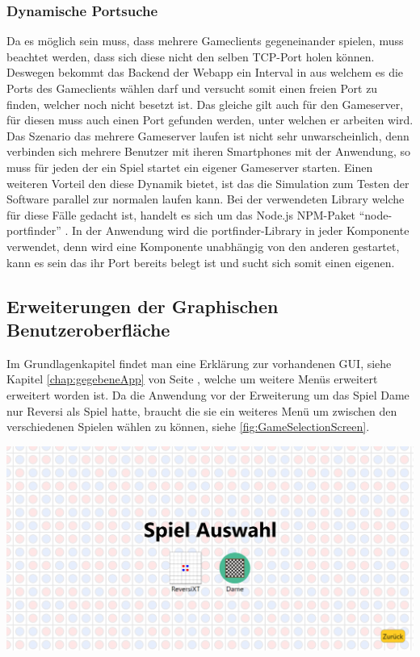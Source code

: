 \documentclass[12pt,a4paper,bibliography=totocnumbered,listof=totocnumbered]{article}
\begin{document}
\subsubsection{Dynamische Portsuche}
Da es möglich sein muss, dass mehrere Gameclients gegeneinander spielen, muss beachtet werden, dass sich diese nicht den selben TCP-Port holen können.
Deswegen bekommt das Backend der Webapp ein Interval in aus welchem es die Ports des Gameclients wählen darf und versucht somit einen freien Port zu finden, welcher noch nicht 
besetzt ist. Das gleiche gilt auch für den Gameserver, für diesen muss auch einen Port gefunden werden, unter welchen er arbeiten wird. 
Das Szenario das mehrere Gameserver laufen ist nicht sehr unwarscheinlich, denn verbinden sich mehrere Benutzer mit iheren Smartphones mit der Anwendung,
so muss für jeden der ein Spiel startet ein eigener Gameserver starten. Einen weiteren Vorteil den diese Dynamik bietet, ist das die Simulation 
zum Testen der Software parallel zur normalen laufen kann. Bei der verwendeten Library welche für diese Fälle gedacht ist, handelt es sich um 
das Node.js NPM-Paket ``node-portfinder'' \cite{portfinder}. In der Anwendung wird die portfinder-Library in jeder Komponente verwendet, denn 
wird eine Komponente unabhängig von den anderen gestartet, kann es sein das ihr Port bereits belegt ist und sucht sich somit einen eigenen.

\subsection{ Erweiterungen der Graphischen Benutzeroberfläche }
Im Grundlagenkapitel findet man eine Erklärung zur vorhandenen GUI, siehe Kapitel \ref{chap:gegebeneApp} von Seite \pageref{chap:gegebeneApp}, welche 
um weitere Menüs erweitert erweitert worden ist. Da die Anwendung vor der Erweiterung um das Spiel Dame nur Reversi als Spiel hatte, 
braucht die sie ein weiteres Menü um zwischen den verschiedenen Spielen wählen zu können, siehe \ref{fig:GameSelectionScreen}.

\vspace{1em}
\begin{minipage}{\linewidth}
	\centering
	\includegraphics[width=0.7\linewidth]{pics/GameSelectionScreen.png}
	\label{fig:GameSelectionScreen}
\end{minipage}
\end{document}
